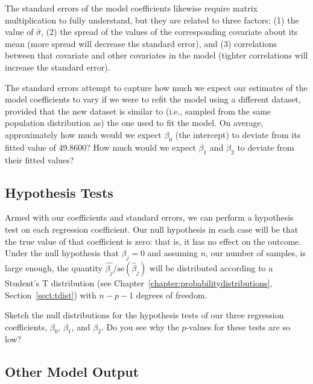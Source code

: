 The standard errors of the model coefficients likewise require matrix multiplication to fully understand, but they are related to three factors: (1) the value of $\hat{\sigma}$, (2) the spread of the values of the corresponding covariate about its mean (more spread will decrease the standard error), and (3) correlations between that covariate and other covariates in the model (tighter correlations will increase the standard error).
\vspace{5mm}

\begin{question}{}
The standard errors attempt to capture how much we expect our estimates of the model coefficients to vary if we were to refit the model using a different dataset, provided that the new dataset is similar to (i.e., sampled from the same population distribution as) the one used to fit the model. On average, approximately how much would we expect $\beta_0$ (the intercept) to deviate from its fitted value of 49.8600? How much would we expect $\beta_1$ and $\beta_2$ to deviate from their fitted values? 
\end{question}

\subsection{Hypothesis Tests}

Armed with our coefficients and standard errors, we can perform a hypothesis test on each regression coefficient. Our null hypothesis in each case will be that the true value of that coefficient is zero: that is, it has no effect on the outcome. Under the null hypothesis that $\beta_j = 0$ and assuming $n$, our number of samples, is large enough, the quantity $\hat{\beta_j}/\text{se}(\hat{\beta}_j)$ will be distributed according to a Student's T distribution (see Chapter~\ref{chapter:probabilitydistributions}, Section~\ref{sect:tdist}) with $n-p-1$ degrees of freedom.
\vspace{5mm}

\begin{question}{}
Sketch the null distributions for the hypothesis tests of our three regression coefficients, $\beta_0$, $\beta_1$, and $\beta_2$. Do you see why the $p$-values for these tests are so low?
\end{question}

\subsection{Other Model Output}

